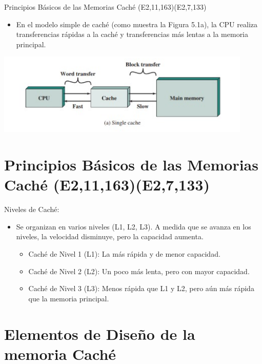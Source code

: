 \documentclass[presentation]{beamer}
\begin{document}
\begin{frame}[label={sec:orgb395b8e}]{Principios Básicos de las Memorias Caché (E2,11,163)(E2,7,133)}
\begin{itemize}
\item En el modelo simple de caché (como muestra la Figura 5.1a), la CPU realiza transferencias rápidas a la caché y transferencias más lentas a la memoria principal.
\end{itemize}

\begin{center}
\includegraphics[width=.9\linewidth]{./Imagenes/captura1.png}
\end{center}
\end{frame}


\section{Principios Básicos de las Memorias Caché (E2,11,163)(E2,7,133)}
\label{sec:org0ed2177}

\begin{frame}[label={sec:org4a50c71}]{Niveles de Caché:}
\begin{itemize}
\item Se organizan en varios niveles (L1, L2, L3). A medida que se avanza en los niveles, la velocidad disminuye, pero la capacidad aumenta.
\begin{itemize}
\item Caché de Nivel 1 (L1): La más rápida y de menor capacidad.
\item Caché de Nivel 2 (L2): Un poco más lenta, pero con mayor capacidad.
\item Caché de Nivel 3 (L3): Menos rápida que L1 y L2, pero aún más rápida que la memoria principal.
\end{itemize}
\end{itemize}
\end{frame}


\section{Elementos de Diseño de la memoria Caché}
\label{sec:org48de856}
\end{document}

